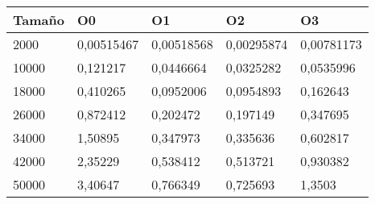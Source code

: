 \begin{tabular}{|l|l|l|l|l|}
	\hline
	Tamaño & O0 & O1 & O2 & O3 \\
	\hline
	\hline
	2000 & 0,00515467 & 0,00518568 & 0,00295874 & 0,00781173 \\
	\hline
	10000 & 0,121217 & 0,0446664 & 0,0325282 & 0,0535996 \\
	\hline
	18000 & 0,410265 & 0,0952006 & 0,0954893 & 0,162643 \\
	\hline
	26000 & 0,872412 & 0,202472 & 0,197149 & 0,347695 \\
	\hline
	34000 & 1,50895 & 0,347973 & 0,335636 & 0,602817 \\
	\hline
	42000 & 2,35229 & 0,538412 & 0,513721 & 0,930382 \\
	\hline
	50000 & 3,40647 & 0,766349 & 0,725693 & 1,3503 \\
	\hline
\end{tabular}
